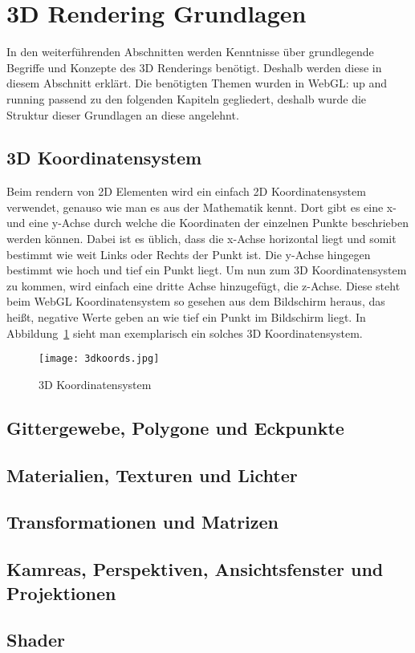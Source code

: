 \section{3D Rendering Grundlagen}
In den weiterführenden Abschnitten werden Kenntnisse über grundlegende Begriffe und Konzepte des 3D Renderings benötigt.
Deshalb werden diese in diesem Abschnitt erklärt.
Die benötigten Themen wurden in WebGL: up and running \cite[4-9]{parisi2012webgl} passend zu den folgenden Kapiteln gegliedert, deshalb wurde die Struktur dieser Grundlagen an diese angelehnt.

\subsection{3D Koordinatensystem}
Beim rendern von 2D Elementen wird ein einfach 2D Koordinatensystem verwendet, genauso wie man es aus der Mathematik kennt. Dort gibt es eine x- und eine y-Achse durch welche die Koordinaten der einzelnen Punkte beschrieben werden können.
Dabei ist es üblich, dass die x-Achse horizontal liegt und somit bestimmt wie weit Links oder Rechts der Punkt ist. Die y-Achse hingegen bestimmt wie hoch und tief ein Punkt liegt.
Um nun zum 3D Koordinatensystem zu kommen, wird einfach eine dritte Achse hinzugefügt, die z-Achse. Diese steht beim WebGL Koordinatensystem so gesehen aus dem Bildschirm heraus, das heißt,
 negative Werte geben an wie tief ein Punkt im Bildschirm liegt.\cite[4]{parisi2012webgl} In Abbildung~\ref{fig:3DKoordinatensystem} sieht man exemplarisch ein solches 3D Koordinatensystem.
 \begin{figure}
    \centering
    \texttt{[image: 3dkoords.jpg]}
    \caption{3D Koordinatensystem \cite{PeterStrohm}} \label{fig:3DKoordinatensystem}
    \end{figure}

\subsection{Gittergewebe, Polygone und Eckpunkte}
\subsection{Materialien, Texturen und Lichter}
\subsection{Transformationen und Matrizen}
\subsection{Kamreas, Perspektiven, Ansichtsfenster und Projektionen}
\subsection{Shader}

